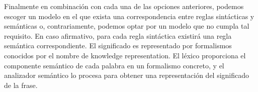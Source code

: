 Finalmente en combinaci\'on con cada una de las opciones anteriores, podemos escoger un modelo en el que exista una correspondencia entre reglas sint\'acticas y sem\'anticas o, contrariamente, podemos optar por un modelo que no cumpla tal requisito. En caso afirmativo, para cada regla sint\'actica existir\'a una regla sem\'antica correspondiente.
El significado es representado por formalismos conocidos por el nombre de knowledge representation. El l\'exico proporciona el componente sem\'antico de cada palabra en un formalismo concreto, y el analizador sem\'antico lo procesa para obtener una representaci\'on del significado de la frase.

\pagebreak
